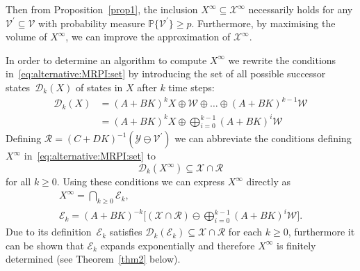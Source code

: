 \documentclass{ifacconf}
\providecommand{\Xinfty}{{\mathscr X}^\infty}
\providecommand{\E}{\mathcal E}
\providecommand{\W}{\mathcal W}
\providecommand{\V}{\mathcal V}
\providecommand{\X}{\mathcal X}
\providecommand{\Y}{\mathcal Y}
\providecommand{\R}{\mathcal R}
\providecommand{\D}{\mathscr D}
\providecommand{\PP}{\mathbb P}
\begin{document}
%
Then from Proposition~\ref{prop1}, the inclusion $X^\infty\subseteq\Xinfty$ necessarily holds for any $\V^\prime\subseteq\V$ with probability measure $\PP\{\V^\prime\} \geq p$. Furthermore, by maximising the volume of $X^\infty$, we can improve the approximation of $\Xinfty$.


In order to determine an algorithm to compute $X^\infty$ we rewrite the conditions in~\eqref{eq:alternative:MRPI:set} by introducing the set of all possible successor states~$\D_k(X)$ of states in $X$ after $k$ time steps:
%
\begin{align*}
	\D_k(X) &= (A+BK)^{k}X\oplus\W\oplus\dots\oplus(A+BK)^{k-1}\W\\
	&= (A+BK)^k X\oplus \bigoplus_{i=0}^{k-1}(A+BK)^i\W
\end{align*}
%
Defining $\R = (C+DK)^{-1}(\Y\ominus\V^\prime)$ we can abbreviate the conditions defining $X^\infty$ in~\eqref{eq:alternative:MRPI:set} to
%
\begin{equation}\label{eq:containment:condition:alternative:MRPI}
\D_k(X^\infty)\subseteq\X\cap\R
\end{equation}
%
for all $k\geq0$.
%
Using these conditions we can express $X^\infty$ directly as
%
\begin{gather}
X^\infty = %
\bigcap_{k\geq0} \E_k, \\
\E_k = (A+BK)^{-k}\biggl[(\X\cap\R)\ominus\bigoplus_{i=0}^{k-1}(A+BK)^i\W\biggr] . \label{eq:Ek:subtract}
\end{gather}
%
Due to its definition~$\E_k$ satisfies $\D_k(\E_k)\subseteq\X\cap\R$ for each $k\geq0$, furthermore it can be shown that $\E_k$ expands exponentially and therefore $X^\infty$ is finitely determined  (see Theorem~\ref{thm2} below).
\end{document}
